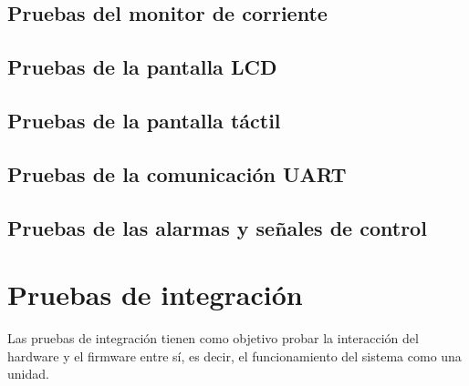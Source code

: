 \subsection{Pruebas del monitor de corriente}



\subsection{Pruebas de la pantalla LCD}

\subsection{Pruebas de la pantalla táctil}

\subsection{Pruebas de la comunicación UART}

\subsection{Pruebas de las alarmas y señales de control}

\section{Pruebas de integración}
\label{sec:pruebasInt}

Las pruebas de integración tienen como objetivo probar la interacción del hardware y el firmware entre sí, es decir, el funcionamiento del sistema como una unidad.